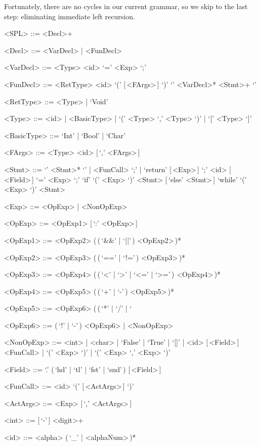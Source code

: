 \documentclass{article}
\begin{document}
Fortunately, there are no cycles in our current grammar, so we skip to the last step: eliminating immediate left recursion.
\begin{grammar}
    <SPL> ::= <Decl>+

    <Decl> ::= <VarDecl> | <FunDecl>

    <VarDecl> ::= <Type> <id> `=' <Exp> `;'

    <FunDecl> ::= <RetType> <id> `(' [\,<FArgs>\,] `)' `{' <VarDecl>* <Stmt>+ `}'

    <RetType> ::= <Type> | `Void'

    <Type> ::= <id> | <BasicType> | `(' <Type> `,' <Type> `)' | `[' <Type> `]'

    <BasicType> ::= `Int' | `Bool' | `Char'

    <FArgs> ::= <Type> <id> [\,`,' <FArgs>\,]

    <Stmt> ::= `{' <Stmt>* `}' | <FunCall> `;' | `return' [\,<Exp>\,] `;'
    \alt <id> [\,<Field>\,] `=' <Exp> `;'
    \alt `if' `(' <Exp> `)' <Stmt> [\,`else' <Stmt>\,]
    \alt `while' `(' <Exp> `)' <Stmt>

    <Exp> ::= <OpExp> | <NonOpExp>

    <OpExp> ::= <OpExp1> [\,`:' <OpExp>\,]

    <OpExp1> ::= <OpExp2> (\,(\,`&&' | `||'\,) <OpExp2>\,)*

    <OpExp2> ::= <OpExp3> (\,(\,`==' | `!='\,) <OpExp3>\,)*

    <OpExp3> ::= <OpExp4> (\,(\,`<' | `>' | `<=' | `>='\,) <OpExp4>\,)*

    <OpExp4> ::= <OpExp5> (\,(\,`+' | `-'\,) <OpExp5>\,)*

    <OpExp5> ::= <OpExp6> (\,(\,`*' | `/' | `%

    <OpExp6> ::= (\,`!' | `-'\,) <OpExp6> | <NonOpExp>

    <NonOpExp> ::= <int> | <char> | `False' | `True' | `[]' | <id> [\,<Field>\,]
    \alt <FunCall> | `(' <Exp> `)' | `(' <Exp> `,' <Exp> `)'

    <Field> ::= `.' (\,`hd' | `tl' | `fst' | `snd'\,) [\,<Field>\,]

    <FunCall> ::= <id> `(' [\,<ActArgs>\,] `)'

    <ActArgs> ::= <Exp> [\,`,' <ActArgs>\,]

    <int> ::= [\,`-'\,] <digit>+

    <id> ::= <alpha> (\,`_' | <alphaNum>\,)*
\end{grammar}
\end{document}
